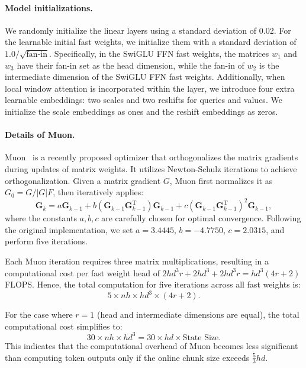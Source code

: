 \paragraph{Model initializations.} We randomly initialize the linear layers using a standard deviation of 0.02. For the learnable initial fast weights, we initialize them with a standard deviation of $1.0 / \sqrt{\text{fan-in}}$. Specifically, in the SwiGLU FFN fast weights, the matrices $w_1$ and $w_3$ have their fan-in set as the head dimension, while the fan-in of $w_2$ is the intermediate dimension of the SwiGLU FFN fast weights. Additionally, when local window attention is incorporated within the \methodname{} layer, we introduce four extra learnable embeddings: two scales and two reshifts for queries and values. We initialize the scale embeddings as ones and the reshift embeddings as zeros.


\paragraph{Details of Muon.} Muon~\cite{jordan2024muon} is a recently proposed optimizer that orthogonalizes the matrix gradients during updates of matrix weights. It utilizes Newton-Schulz iterations to achieve orthogonalization. Given a matrix gradient $G$, Muon first normalizes it as $G_0 = G / |G|F$, then iteratively applies:
\begin{equation}
\mathbf{G}_k = a\mathbf{G}_{k-1} + b(\mathbf{G}_{k-1}\mathbf{G}_{k-1}^{\mathrm{T}})\mathbf{G}_{k-1} + c(\mathbf{G}_{k-1}\mathbf{G}_{k-1}^{\mathrm{T}})^2\mathbf{G}_{k-1},
\label{eq:muon_iteration}
\end{equation}
where the constants $a, b, c$ are carefully chosen for optimal convergence. Following the original implementation, we set $a=3.4445$, $b=-4.7750$, $c=2.0315$, and perform five iterations.

Each Muon iteration requires three matrix multiplications, resulting in a computational cost per fast weight head of $2 \mathit{hd}^3 r + 2 \mathit{hd}^3 + 2 \mathit{hd}^3 r = \mathit{hd}^3 (4r + 2)$ FLOPS. Hence, the total computation for five iterations across all fast weights is:
\begin{equation}
5 \times \mathit{nh} \times \mathit{hd}^3 \times (4r + 2).
\end{equation}

For the case where $r=1$ (head and intermediate dimensions are equal), the total computational cost simplifies to:
\begin{equation}
30 \times \mathit{nh} \times \mathit{hd}^3 = 30 \times \mathit{hd} \times \text{State Size}.
\end{equation}
This indicates that the computational overhead of Muon becomes less significant than computing token outputs only if the online chunk size exceeds $\frac{5}{3} \mathit{hd}$.



